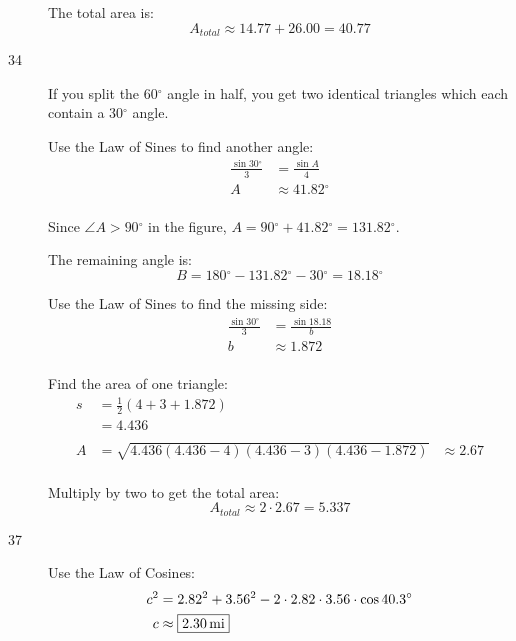 \documentclass{exam}
\newcommand{\dg}{\ensuremath{^\circ}}
\begin{document}
\begin{description}
        The total area is: 
        \[
          A_{total} \approx 14.77 + 26.00 = \boxed{ 40.77 }
        \]

      \item[34]
        If you split the $60 \dg$ angle in half, you get two identical triangles which each contain a $30 \dg$ angle.

        Use the Law of Sines to find another angle:
        \begin{align*}
          \frac{\sin 30 \dg}{3} & = \frac{\sin A}{4} \\
          A                     & \approx 41.82 \dg \\
        \end{align*}

        Since $\angle A > 90 \dg$ in the figure, $A = 90 \dg + 41.82 \dg = 131.82 \dg$.

        The remaining angle is:
        \[
          B = 180 \dg - 131.82 \dg - 30 \dg = 18.18 \dg
        \]

        Use the Law of Sines to find the missing side:
        \begin{align*}
          \frac{\sin 30 \dg}{3} & = \frac{\sin 18.18}{b} \\
          b                     & \approx 1.872 \\
        \end{align*}

        Find the area of one triangle:
        \begin{align*}
          s  & = \frac{1}{2}(4 + 3 + 1.872) \\
             & = 4.436 \\
          \\
          A  & = \sqrt{4.436 (4.436 - 4)(4.436 - 3) (4.436 - 1.872)}
             & \approx 2.67 \\
        \end{align*}

        Multiply by two to get the total area:
        \[
          A_{total} \approx 2 \cdot 2.67 = \boxed{ 5.337 }
        \]

      \item[37]
        Use the Law of Cosines:
        \begin{align*}
          c^2 & = 2.82^2 + 3.56^2 - 2 \cdot 2.82 \cdot 3.56 \cdot \cos 40.3 \dg \\
          c   & \approx \boxed{ \unit[2.30]{mi} } \\
        \end{align*}


\end{description}
\end{document}
